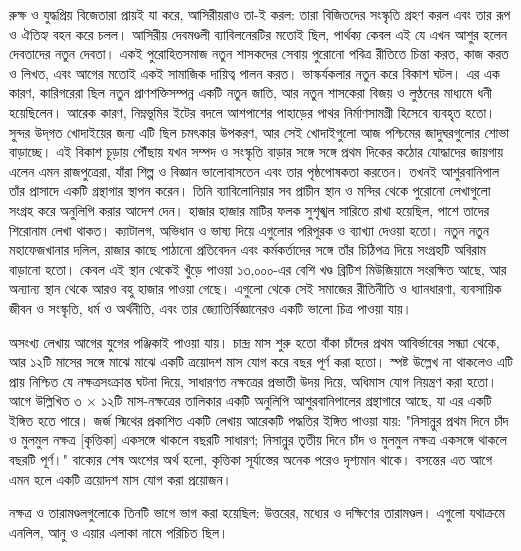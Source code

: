 রুক্ষ ও যুদ্ধপ্রিয় বিজেতারা প্রায়ই যা করে, আসিরীয়রাও তা-ই করল: তারা বিজিতদের সংস্কৃতি গ্রহণ করল এবং তার রূপ ও ঐতিহ্য বহন করে চলল। আসিরীয় দেবমণ্ডলী ব্যাবিলনেরটির মতোই ছিল, পার্থক্য কেবল এই যে এখন আশুর হলেন দেবতাদের নতুন দেবতা। একই পুরোহিতসমাজ নতুন শাসকদের সেবায় পুরোনো পবিত্র রীতিতে চিন্তা করত, কাজ করত ও লিখত, এবং আগের মতোই একই সামাজিক দায়িত্ব পালন করত। ভাস্কর্যকলার নতুন করে বিকাশ ঘটল। এর এক কারণ, কারিগরেরা ছিল নতুন প্রাণশক্তিসম্পন্ন একটি নতুন জাতি, আর নতুন শাসকেরা বিজয় ও লুণ্ঠনের মাধ্যমে ধনী হয়েছিলেন। আরেক কারণ, নিম্নভূমির ইটের বদলে আশপাশের পাহাড়ের পাথর নির্মাণসামগ্রী হিসেবে ব্যবহৃত হতো। সুন্দর উদ্‌গত খোদাইয়ের জন্য এটি ছিল চমৎকার উপকরণ, আর সেই খোদাইগুলো আজ পশ্চিমের জাদুঘরগুলোর শোভা বাড়াচ্ছে। এই বিকাশ চূড়ায় পৌঁছায় যখন সম্পদ ও সংস্কৃতি বাড়ার সঙ্গে সঙ্গে প্রথম দিকের কঠোর যোদ্ধাদের জায়গায় এলেন এমন রাজপুত্রেরা, যাঁরা শিল্প ও বিজ্ঞান ভালোবাসতেন এবং তার পৃষ্ঠপোষকতা করতেন। তখনই আশুরবানিপাল তাঁর প্রাসাদে একটি গ্রন্থাগার স্থাপন করেন। তিনি ব্যাবিলোনিয়ার সব প্রাচীন স্থান ও মন্দির থেকে পুরোনো লেখাগুলো সংগ্রহ করে অনুলিপি করার আদেশ দেন। হাজার হাজার মাটির ফলক সুশৃঙ্খল সারিতে রাখা হয়েছিল, পাশে তাদের শিরোনাম লেখা থাকত। ক্যাটালগ, অভিধান ও ভাষ্য দিয়ে এগুলোর পরিপূরক ও ব্যাখ্যা দেওয়া হতো। নতুন নতুন মহাফেজখানার দলিল, রাজার কাছে পাঠানো প্রতিবেদন এবং কর্মকর্তাদের সঙ্গে তাঁর চিঠিপত্র দিয়ে সংগ্রহটি অবিরাম বাড়ানো হতো। কেবল এই স্থান থেকেই খুঁড়ে পাওয়া ১৩,০০০-এর বেশি খণ্ড ব্রিটিশ মিউজিয়ামে সংরক্ষিত আছে, আর অন্যান্য স্থান থেকে আরও বহু হাজার পাওয়া গেছে। এগুলো থেকে সেই সমাজের রীতিনীতি ও ধ্যানধারণা, ব্যবসায়িক জীবন ও সংস্কৃতি, ধর্ম ও অর্থনীতি, এবং তার জ্যোতির্বিজ্ঞানেরও একটি ভালো চিত্র পাওয়া যায়।

অসংখ্য লেখায় আগের যুগের পঞ্জিকাই পাওয়া যায়। চান্দ্র মাস শুরু হতো বাঁকা চাঁদের প্রথম আবির্ভাবের সন্ধ্যা থেকে, আর ১২টি মাসের সঙ্গে মাঝে মাঝে একটি ত্রয়োদশ মাস যোগ করে বছর পূর্ণ করা হতো। স্পষ্ট উল্লেখ না থাকলেও এটি প্রায় নিশ্চিত যে নক্ষত্রসংক্রান্ত ঘটনা দিয়ে, সাধারণত নক্ষত্রের প্রভাতী উদয় দিয়ে, অধিমাস যোগ নিয়ন্ত্রণ করা হতো। আগে উল্লিখিত ৩ × ১২টি মাস-নক্ষত্রের তালিকার একটি অনুলিপি আশুরবানিপালের গ্রন্থাগারে আছে, যা এর একটি ইঙ্গিত হতে পারে। জর্জ স্মিথের প্রকাশিত একটি লেখায় আরেকটি পদ্ধতির ইঙ্গিত পাওয়া যায়: "নিসান্নুর প্রথম দিনে চাঁদ ও মুলমুল নক্ষত্র [কৃত্তিকা] একসঙ্গে থাকলে বছরটি সাধারণ; নিসান্নুর তৃতীয় দিনে চাঁদ ও মুলমুল নক্ষত্র একসঙ্গে থাকলে বছরটি পূর্ণ।" বাক্যের শেষ অংশের অর্থ হলো, কৃত্তিকা সূর্যাস্তের অনেক পরেও দৃশ্যমান থাকে। বসন্তের এত আগে এমন হলে একটি ত্রয়োদশ মাস যোগ করা প্রয়োজন।

নক্ষত্র ও তারামণ্ডলগুলোকে তিনটি ভাগে ভাগ করা হয়েছিল: উত্তরের, মধ্যের ও দক্ষিণের তারামণ্ডল। এগুলো যথাক্রমে এনলিল, আনু ও এয়ার এলাকা নামে পরিচিত ছিল।

